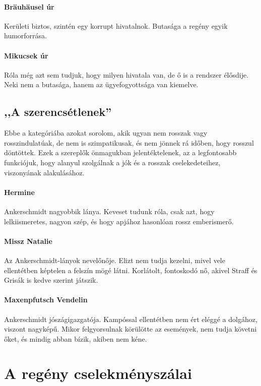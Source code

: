 \documentclass{thesis-ekf}
\begin{document}
    \paragraph{Bräuhäusel úr}
    Kerületi biztos, szintén egy korrupt hivatalnok.
    Butasága a regény egyik humorforrása.

    \paragraph{Mikucsek úr}
    Róla még azt sem tudjuk, hogy milyen hivatala van, de ő is a rendszer élősdije.
    Neki nem a butasága, hanem az ügyefogyottsága van kiemelve.

    \subsection{,,A szerencsétlenek''}

    Ebbe a kategóriába azokat sorolom, akik ugyan nem rosszak vagy rosszindulatúak, de nem is szimpatikusak,
        és nem jönnek rá időben, hogy rosszul döntöttek.
    Ezek a szereplők önmagukban jelentéktelenek, az a legfontosabb funkciójuk, hogy alanyul szolgálnak
        a jók és a rosszak cselekedeteihez, viszonyának alakulásához.

    \paragraph{Hermine}
    Ankerschmidt nagyobbik lánya.
    Keveset tudunk róla, csak azt, hogy lelkiismeretes, nagyon szép, és hogy apjához hasonlóan rossz emberismerő.

    \paragraph{Missz Natalie}
    Az Ankerschmidt-lányok nevelőnője.
    Elizt nem tudja kezelni, mivel vele ellentétben képtelen a felszín mögé látni.
    Korlátolt, fontoskodó nő, akivel Straff és Grisák is kedve szerint játszik.

    \paragraph{Maxenpfutsch Vendelin}
    Ankerschmidt jószágigazgatója.
    Kampóssal ellentétben nem ért eléggé a dolgához, viszont nagyképű.
    Mikor felgyorsulnak körülötte az események, nem tudja követni őket, és mindig abban bízik, akiben nem kéne.

    \section{A regény cselekményszálai}
\end{document}
